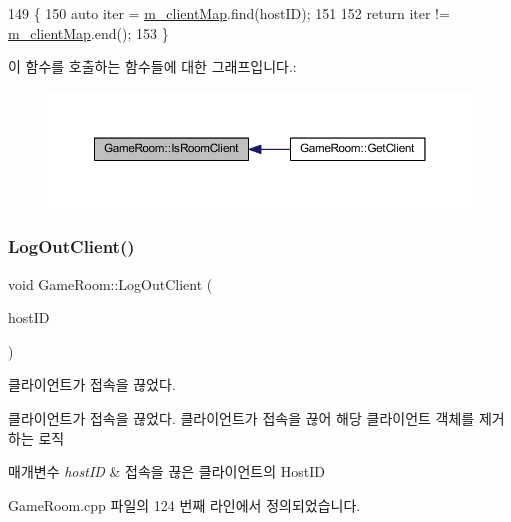 \begin{DoxyCode}
149 \{
150     \textcolor{keyword}{auto} iter = \hyperlink{class_game_room_afc202a511605453216f7dd870ff96c5c}{m\_clientMap}.find(hostID);
151 
152     \textcolor{keywordflow}{return}  iter != \hyperlink{class_game_room_afc202a511605453216f7dd870ff96c5c}{m\_clientMap}.end();
153 \}
\end{DoxyCode}
이 함수를 호출하는 함수들에 대한 그래프입니다.\+:\nopagebreak
\begin{figure}[H]
\begin{center}
\leavevmode
\includegraphics[width=350pt]{class_game_room_a48687c02109ec932166223aa144c8c1f_icgraph}
\end{center}
\end{figure}
\mbox{\label{class_game_room_a4811bd3795a4f8130718bb7a9a2c4b0f}} 
\subsubsection{\texorpdfstring{Log\+Out\+Client()}{LogOutClient()}}
{\footnotesize\ttfamily void Game\+Room\+::\+Log\+Out\+Client (\begin{DoxyParamCaption}\item[{Host\+ID}]{host\+ID }\end{DoxyParamCaption})}



클라이언트가 접속을 끊었다. 

클라이언트가 접속을 끊었다.  클라이언트가 접속을 끊어 해당 클라이언트 객체를 제거하는 로직


\begin{DoxyParams}{매개변수}
{\em host\+ID} & 접속을 끊은 클라이언트의 Host\+ID \\
\hline
\end{DoxyParams}


Game\+Room.\+cpp 파일의 124 번째 라인에서 정의되었습니다.


